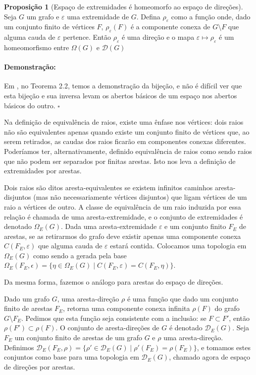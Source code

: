 \documentclass[11pt]{article}
\renewcommand{\textit}[1]{{\fakeitalic#1}}
\newcommand{\pulinho}{\vspace{.5cm}}
\theoremstyle{definition}
\theoremstyle{definition}
\theoremstyle{definition}
\newtheorem{prop}{Proposição}
\newenvironment{proposicao}{
\definecolor{shadecolor}{HTML}{FFDBDF}
\begin{shaded}
\begin{prop}
}
{
\end{prop}
\end{shaded}
}
\theoremstyle{definition}
\theoremstyle{definition}
\theoremstyle{definition}
\theoremstyle{definition}
\theoremstyle{definition}
\newtheorem*{definition*}{Definição}
\newenvironment{definicao*}{
\definecolor{shadecolor}{HTML}{defcfc}
\begin{shaded}
\begin{definition*}
}
{
\end{definition*}
\end{shaded}
}
\theoremstyle{definition}
\theoremstyle{definition}
\theoremstyle{definition}
\theoremstyle{definition}
\newenvironment{prova}{\paragraph{Demonstração:}}{\hfill$\square$ 
\pulinho
}
\begin{document}
\begin{proposicao}[Espaço de extremidades é homeomorfo ao espaço de direções]
    Seja $G$ um grafo e $\varepsilon$ uma extremidade de $G$. Defina $\rho_{\varepsilon}$ como a função onde, dado um conjunto finito de vértices $F$,  $\rho_{\varepsilon}(F)$ é a componente conexa de $G \setminus F$ que alguma cauda de $\varepsilon$ pertence. Então $\rho_{\varepsilon}$ é uma direção e o mapa $\varepsilon \mapsto \rho_{\varepsilon}$ é um homeomorfismo entre $\Omega(G)$ e $\mathcal{D}(G)$
\end{proposicao}
\begin{prova}
    Em \cite{Diestel2003}, no Teorema 2.2, temos a demonstração da bijeção, e não é difícil ver que esta bijeção e sua inversa levam os abertos básicos de um espaço nos abertos básicos do outro.
\end{prova}

Na definição de equivalência de raios, existe uma ênfase nos vértices: dois raios não são equivalentes apenas quando existe um conjunto finito de vértices que, ao serem retirados, as caudas dos raios ficarão em componentes conexas diferentes. Poderíamos ter, alternativamente, definido equivalência de raios como sendo raios que não podem ser separados por finitas arestas. Isto nos leva a definição de extremidades por arestas.

\begin{definicao*}
    Dois raios são ditos \textit{aresta-equivalentes} se existem infinitos caminhos aresta-disjuntos (mas não necessariamente vértices disjuntos) que ligam vértices de um raio a vértices de outro. A classe de equivalência de um raio induzida por essa relação é chamada de uma \textit{aresta-extremidade}, e o conjunto de extremidades é denotado $\Omega_E(G)$. Dada uma aresta-extremidade $\varepsilon$ e um conjunto finito $F_E$ de \textit{arestas}, se as retirarmos do grafo deve existir apenas uma componente conexa $C(F_E,\varepsilon)$ que alguma cauda de $\varepsilon$ estará contida. Colocamos uma topologia em $\Omega_E(G)$ como sendo a gerada pela base $\Omega_E(F_E,\epsilon) = \{\eta \in \Omega_E(G) \mid C(F_E,\varepsilon) = C(F_E,\eta)\}$.
\end{definicao*}

Da mesma forma, fazemos o análogo para arestas do espaço de direções.

\begin{definicao*}
    Dado um grafo $G$, uma \textit{aresta-direção} $\rho$ é uma função que dado um conjunto finito de arestas $F_E$, retorna uma componente conexa \textit{infinita} $\rho(F)$ do grafo $G \setminus F_E$. Pedimos que esta função seja consistente com a inclusão: se $F \subset F'$, então $\rho(F') \subset \rho(F)$. O conjunto de aresta-direções de $G$ é denotado $\mathcal{D}_E(G)$. Seja $F_E$ um conjunto finito de arestas de um grafo $G$ e $\rho$ uma aresta-direção. Definimos $\mathcal{D}_E(F_E,\rho) = \{\rho' \in \mathcal{D}_E(G) \mid \rho'(F_E) = \rho(F_E)\}$, e tomamos estes conjuntos como base para uma topologia em $\mathcal{D}_E(G)$, chamado agora de \textit{espaço de direções por arestas}.
\end{definicao*}
\end{document}
